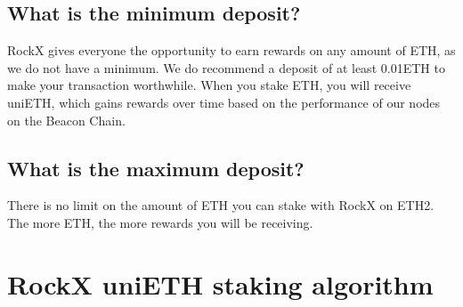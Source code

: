 \documentclass{article}
\begin{document}
\subsection{What is the minimum deposit?}
RockX gives everyone the opportunity to earn rewards on any amount of ETH, as we do not have a minimum. We do recommend a deposit of at least 0.01ETH to make your transaction worthwhile. When you stake ETH, you will receive uniETH, which gains rewards over time based on the performance of our nodes on the Beacon Chain.

\subsection{What is the maximum deposit?}   
There is no limit on the amount of ETH you can stake with RockX on ETH2. The more ETH, the more rewards you will be receiving.

\section{RockX uniETH staking algorithm}
\end{document}
